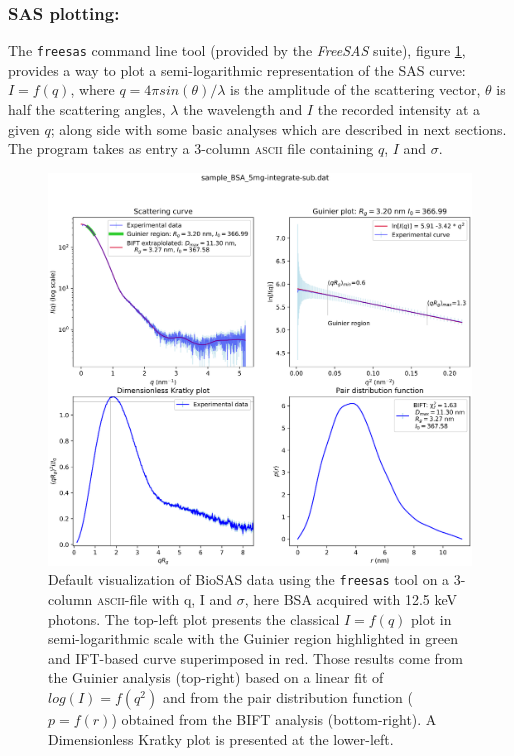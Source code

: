 \documentclass[preprint]{iucr}              %
\begin{document}
\subsubsection{SAS plotting:} The \texttt{freesas} command line tool (provided by the \textit{FreeSAS} suite), figure \ref{plot}, provides a way to plot a semi-logarithmic representation of the SAS curve: $I=f(q)$, where $q = 4\pi sin(\theta)/\lambda$ is the amplitude of the scattering vector, $\theta$ is half the scattering angles, $\lambda$ the wavelength and $I$ the recorded intensity at a given $q$; along side with some basic analyses which are described in next sections.
The program takes as entry a 3-column \textsc{ascii} file containing $q$, $I$ and $\sigma$. 

\begin{figure}
\label{plot}
\includegraphics[width=12cm]{Figure_1.eps}
\caption{Default visualization of BioSAS data using the \texttt{freesas} tool on a 3-column \textsc{ascii}-file with q, I and $\sigma$, here BSA acquired with 12.5 keV photons. 
The top-left plot presents the classical $I=f(q)$ plot in semi-logarithmic scale with the Guinier region highlighted in green and IFT-based curve superimposed in red. Those results come from the Guinier analysis (top-right) based on a linear fit of $log(I)=f(q^2)$ and from the pair distribution function ($p=f(r)$) obtained from the BIFT analysis (bottom-right).
A Dimensionless Kratky plot is presented at the lower-left. 
}
\end{figure}
\end{document}
